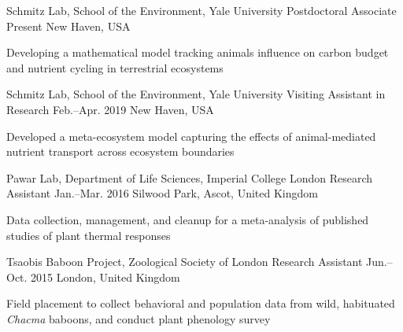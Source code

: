 

\begin{cventries}

  \cventry
    {Schmitz Lab, School of the Environment, Yale University} %
    {Postdoctoral Associate} %
    {Present} %
    {New Haven, USA} %
    {
      \begin{cvitems} %
        \item {Developing a mathematical model tracking animals influence on carbon budget and nutrient cycling in terrestrial ecosystems}
      \end{cvitems} 
    }

  \cventry
    {Schmitz Lab, School of the Environment, Yale University} %
    {Visiting Assistant in Research} %
    {Feb.--Apr. 2019} %
    {New Haven, USA} %
    {
      \begin{cvitems} %
        \item {Developed a meta-ecosystem model capturing the effects of animal-mediated nutrient transport across ecosystem boundaries}
      \end{cvitems}  
    }

  \cventry
    {Pawar Lab, Department of Life Sciences, Imperial College London} %
    {Research Assistant} %
    {Jan.--Mar. 2016} %
    {Silwood Park, Ascot, United Kingdom} %
    {
      \begin{cvitems} %
        \item {Data collection, management, and cleanup for a meta-analysis of published studies of plant thermal responses}
      \end{cvitems}  
    }

  \cventry
    {Tsaobis Baboon Project, Zoological Society of London} %
    {Research Assistant} %
    {Jun.--Oct. 2015} %
    {London, United Kingdom} %
    {
       \begin{cvitems} %
        \item {Field placement to collect behavioral and population data from wild, habituated \textit{Chacma} baboons, and conduct plant phenology survey}
      \end{cvitems}  
    }


\end{cventries}
